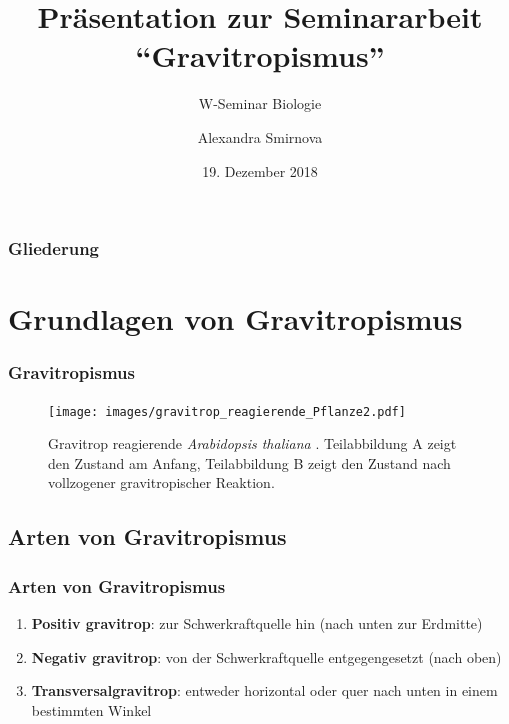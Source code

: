 \documentclass[aspectratio=169
]{beamer}
\author{Alexandra Smirnova}
\title{Präsentation zur Seminararbeit \hyphenquote{ngerman}{Gravitropismus}}
\subtitle{W-Seminar Biologie}
\date{19. Dezember 2018}
\begin{document}
	
	\maketitle
	
	\begin{frame}[<+(1)->]

		\frametitle{Gliederung}
		
	\end{frame}
	
	\section{Grundlagen von Gravitropismus}

	
	\begin{frame}[<+(1)->]
		\frametitle{Gravitropismus}
		\begin{figure}[H]
			\centering 
			\texttt{[image: images/gravitrop\_reagierende\_Pflanze2.pdf]}
			\caption{Gravitrop reagierende \emph{Arabidopsis thaliana} \parencite[5]{Masson2002}. Teilabbildung A zeigt den Zustand am Anfang, Teilabbildung B zeigt den Zustand nach vollzogener gravitropischer Reaktion. \label{gravitrop_reagierende_Pflanze}}
			
		\end{figure} 
	\end{frame}
	
	\subsection{Arten von Gravitropismus}
	
	\begin{frame}[<+(1)->]
		\frametitle{Arten von Gravitropismus}
\begin{enumerate}
\item \textbf{Positiv gravitrop}: zur Schwerkraftquelle hin (nach unten zur Erdmitte)
\item \textbf{Negativ gravitrop}: von der Schwerkraftquelle entgegengesetzt (nach oben)
\item \textbf{Transversalgravitrop}: entweder horizontal oder quer nach unten in einem bestimmten Winkel
\end{enumerate} 
		
\end{frame}
	
\end{document}
